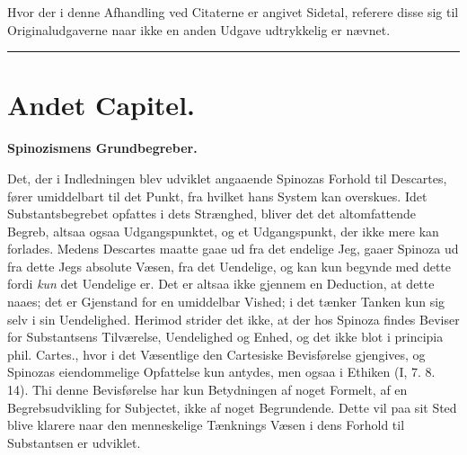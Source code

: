 \documentclass[12pt,a4paper]{book}
\newcommand{\opage}[1]{\marginnote{\footnotesize\textit{[#1]}}}
\begin{document}
Hvor der i denne Afhandling ved Citaterne er angivet Sidetal, referere
disse sig til Originaludgaverne naar ikke en anden Udgave udtrykkelig er
nævnet.

\bigskip
\begin{center}\rule{2.5cm}{0.4pt}\end{center}

\newpage

\chapter*{Andet Capitel.}

\begin{center}
\textbf{Spinozismens Grundbegreber.}
\end{center}

\opage{44} Det, der i Indledningen blev udviklet angaaende Spinozas Forhold til
Descartes, fører umiddelbart til det Punkt, fra hvilket hans System kan
overskues. Idet Substantsbegrebet opfattes i dets Strænghed, bliver det
det altomfattende Begreb, altsaa ogsaa Udgangspunktet, og et
Udgangspunkt, der ikke mere kan forlades. Medens Descartes maatte gaae
ud fra det endelige Jeg, gaaer Spinoza ud fra dette Jegs absolute
Væsen, fra det Uendelige, og kan kun begynde med dette fordi \emph{kun} det
Uendelige er. Det er altsaa ikke gjennem en Deduction, at dette naaes;
det er Gjenstand for en umiddelbar Vished; i det tænker Tanken kun sig
selv i sin Uendelighed. Herimod strider det ikke, at der hos Spinoza
findes Beviser for Substantsens Tilværelse, Uendelighed og Enhed, og
det ikke blot i principia phil. Cartes., hvor i det Væsentlige den
Cartesiske Bevisførelse gjengives, og Spinozas eiendommelige Opfattelse
kun antydes, men ogsaa i Ethiken (I, 7. 8. 14). Thi denne Bevisførelse
har kun Betydningen af noget Formelt, af en Begrebsudvikling for
Subjectet, ikke af noget Begrundende. Dette vil paa sit Sted blive
klarere naar den menneskelige Tænknings Væsen i dens Forhold til
Substantsen er udviklet.
\end{document}
